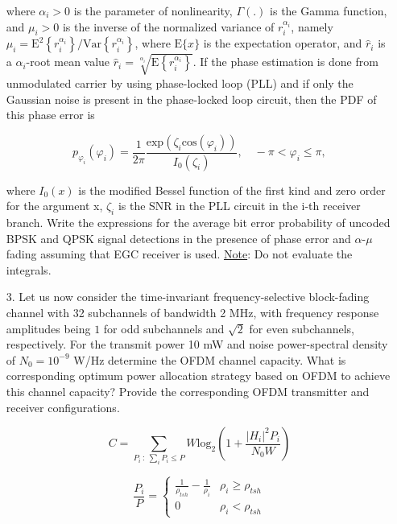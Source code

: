\documentclass[fleqn]{article}
\makeatletter
\newenvironment{equationCenter}{\@fleqnfalse\begin{equation*}}{\end{equation*}}
\makeatother
\begin{document}
\begin{enumerate}
		where $\alpha_i > 0$ is the parameter of nonlinearity, $\Gamma(.)$ is the Gamma function, and $\mu_i > 0$ is the inverse of the normalized variance of $r_i^{\alpha_i}$, namely $\mu_i = \text{E}^2\left\{r_i^{\alpha_i}\right\}/\text{Var}\left\{r_i^{\alpha_i}\right\}$, where $\text{E}\{x\}$ is the expectation operator, and $\hat{r}_i$ is a $\alpha_i$-root mean value $\hat{r}_i=\sqrt[\alpha_i]{\text{E}\left\{r_i^{\alpha_i}\right\}}$. If the phase estimation is done from unmodulated carrier by using phase-locked loop (PLL) and if only the Gaussian noise is present in the phase-locked loop circuit, then the PDF of this phase error is

		\begin{equationCenter}
			p_{\varphi_i}(\varphi_i) = \frac{1}{2\pi}\frac{\text{exp}(\zeta_i\text{cos}(\varphi_i))}{I_0(\zeta_i)}, \quad -\pi < \varphi_i \leq \pi,
		\end{equationCenter}
		
		where $I_0(x)$ is the modified Bessel function of the first kind and zero order for the argument x, $\zeta_i$ is the SNR in the PLL circuit in the i-th receiver branch. Write the expressions for the average bit error probability of uncoded BPSK and QPSK signal detections in the presence of phase error and $\alpha$-$\mu$ fading assuming that EGC receiver is used. \underline{Note}: Do not evaluate the integrals.
		
		\item[3.] Let us now consider the time-invariant frequency-selective block-fading channel with 32 subchannels of bandwidth 2 MHz, with frequency response amplitudes being $1$ for odd subchannels and $\sqrt{2}$ for even subchannels, respectively. For the transmit power 10 mW and noise power-spectral density of $N_0=10^{-9}$ W/Hz determine the OFDM channel capacity. What is corresponding optimum power allocation strategy based on OFDM to achieve this channel capacity? Provide the corresponding OFDM transmitter and receiver configurations.
		
		\begin{equation*}
			C = \underset{P_i \ :\ \sum_i{P_i \leq P}}{\sum}{W\text{log}_2\left(1 + \frac{|H_i|^2P_i}{N_0W}\right)}
		\end{equation*}
		
		\begin{equation*}
			\frac{P_i}{P} = \begin{cases}
				\frac{1}{\rho_{tsh}} - \frac{1}{\rho_i} & \rho_i \geq \rho_{tsh} \\
				0 & \rho_i < \rho_{tsh}
			\end{cases}
		\end{equation*}
		

\end{enumerate}
\end{document}
